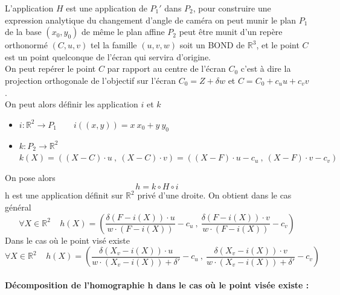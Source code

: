L'application $H$ est une application de $P_{1}'$ dans $P_{2}$, pour construire une expression analytique du changement d'angle de caméra on peut munir le plan $P_{1}$ de la base $(x_{0},y_{0})$ de même le  plan affine $P_{2}$ peut être munit d'un repère orthonormé $(C,u,v)$ tel la famille $(u,v,w)$ soit un BOND de $\mathbb{R}^{3}$, et le point $C$ est un point quelconque de l'écran qui servira d'origine.\\
On peut repérer le point $C$ par rapport au centre de l'écran $C_{0}$ c'est à dire la projection orthogonale de l'objectif sur l'écran $C_{0}=Z+\delta w$ et $C=C_{0}+c_{u}u+c_{v}v$.\\
On peut alors définir les application $i$ et $k$
\begin{itemize}
\item $i:\mathbb{R}^{2}\rightarrow P_{1}$~~~~$i((x,y))=x~x_{0}+y~y_{0}$
\item $k:P_{2}\rightarrow \mathbb{R}^{2}$~~~~$k(X)= ((X-C)\cdot u~,~(X-C)\cdot v)=((X-F)\cdot u-c_{u}~,~ (X-F)\cdot v-c_{v})$
\end{itemize}
On pose alors 
\begin{equation*}
h=k\circ H \circ i
\end{equation*}
h est une application définit sur $\mathbb{R}^{2}$ privé d'une droite. On obtient dans le cas général
\begin{equation*}
\forall X\in \mathbb{R}^{2} ~~~~~h(X)=\left(\frac{\delta (F-i(X))\cdot u}{w \cdot (F-i(X))}-c_{u}~,~\frac{\delta (F-i(X))\cdot v}{w \cdot (F-i(X))} -c_{v} \right) 
\end{equation*} 
Dans le cas où le point visé existe
\begin{equation*}
\forall X\in \mathbb{R}^{2} ~~~~~h(X)=\left(\frac{\delta (X_{v}-i(X))\cdot u}{w \cdot (X_{v}-i(X))+\delta'}-c_{u}~,~\frac{\delta (X_{v}-i(X))\cdot v}{w \cdot (X_{v}-i(X))+\delta'} -c_{v} \right) 
\end{equation*}



\paragraph{Décomposition de l'homographie h dans le cas où le point visée existe :}

